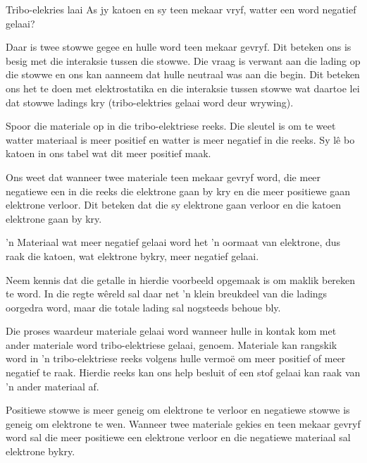 \begin{wex}{Tribo-elekries laai}
{
As jy katoen  en sy teen mekaar vryf, watter een word negatief gelaai?
}
{

Daar is twee stowwe gegee en hulle word teen mekaar gevryf. Dit beteken ons is besig met die interaksie tussen die stowwe. Die vraag is verwant aan die lading op die stowwe en ons kan aanneem dat hulle neutraal was aan die begin. Dit beteken ons het te doen met elektrostatika en die interaksie tussen stowwe wat daartoe lei dat stowwe ladings kry (tribo-elektries gelaai word deur wrywing).



Spoor die materiale op in die tribo-elektriese reeks. Die sleutel is om te weet watter materiaal is meer positief en watter is meer negatief in die reeks. Sy l\^e bo katoen in ons tabel wat dit meer positief maak.

Ons weet dat wanneer twee materiale teen mekaar gevryf word, die meer negatiewe een in die reeks die elektrone gaan by kry en die meer positiewe gaan elektrone verloor. Dit beteken dat die sy elektrone gaan verloor en die katoen elektrone gaan by kry.
\par
 'n Materiaal wat meer negatief gelaai word het 'n oormaat van elektrone, dus raak die katoen, wat elektrone bykry, meer negatief gelaai.
}\end{wex}


Neem kennis dat die getalle in hierdie voorbeeld opgemaak is om maklik bereken te word. In die regte w\^ereld sal daar net 'n klein breukdeel van die ladings oorgedra word, maar die totale lading sal nogsteeds behoue bly. \par
{}
Die proses waardeur materiale gelaai word wanneer hulle in kontak kom met ander materiale word tribo-elektriese gelaai, genoem. Materiale kan rangskik word in 'n tribo-elektriese reeks volgens hulle vermo\"e om meer positief of meer negatief te raak. Hierdie reeks kan ons help besluit of een stof gelaai kan raak van 'n ander materiaal af.

Positiewe stowwe is meer geneig om elektrone te verloor en negatiewe stowwe is geneig om elektrone te wen. Wanneer twee materiale gekies en teen mekaar gevryf word sal die meer positiewe een elektrone verloor en die negatiewe materiaal sal elektrone bykry.

